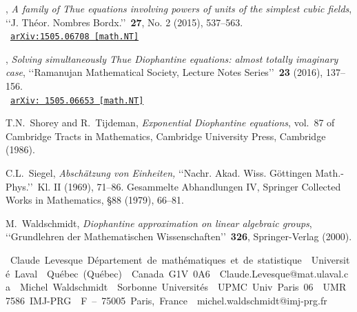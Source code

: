 \documentclass[leqno,11pt]{article}
\begin{document}
\begin{thebibliography}{99}
{\bysame}, {\em
A family of Thue equations involving powers of units of the simplest cubic fields}, 
\lq\lq J. Th\'eor. Nombres Bordx.\rq\rq\ {\bf 27}, No. 2 (2015), 537--563.
 \\
\hbox{ 
\small \tt \href{http://arxiv.org/abs/1505.06708}{\tt arXiv:1505.06708 [math.NT]}}


 

{\bysame}, 
{\em
Solving simultaneously Thue Diophantine equations: almost totally imaginary case},
\lq\lq Ramanujan Mathematical Society, Lecture Notes Series\rq\rq\
{\bf 23} %
(2016), 137--156.
\\
\hbox{ 
\small \tt \href{http://arxiv.org/abs/1505.06653}{\tt arXiv: 1505.06653 [math.NT]}}




{\sc T.N.~Shorey and R.~Tijdeman}, {\em Exponential {D}iophantine equations},
 vol.~87 of Cambridge Tracts in Mathematics, Cambridge University Press,
 Cambridge (1986).

{\sc C.L.~Siegel}, {\em
Absch\"atzung von Einheiten,} \lq\lq Nachr. Akad. Wiss. G\"ottingen Math.-Phys.\rq\rq\ Kl. II (1969), 71--86. 
Gesammelte Abhandlungen IV, Springer Collected Works in Mathematics, \S88 (1979), 66--81.

{\sc M.~Waldschmidt}, {\em Diophantine approximation on linear algebraic groups},
 \lq\lq Grundlehren der Mathematischen Wissenschaften\rq\rq\ {\bf 326},
 Springer-Verlag (2000).

\end{thebibliography}

\vfill
 \vfill
 
\hbox{
\small
\vbox{
\hbox{Claude \sc Levesque}
	\hbox{D\'{e}partement de math\'{e}matiques et de statistique
	}
	\hbox{Universit\'{e} Laval
	}
	\hbox{Qu\'{e}bec (Qu\'{e}bec)
	}
	\hbox{\sc Canada G1V 0A6
	}
	\hbox{Claude.Levesque@mat.ulaval.ca
	}
}	
\hfill
\vbox{	\hbox{Michel \sc Waldschmidt
	}
	\hbox{Sorbonne Universit\'es
	}
	\hbox{UPMC Univ Paris 06
	}
	\hbox{UMR 7586 IMJ-PRG
	}
	\hbox{F -- 75005 Paris, \sc France 
	}
	\hbox{michel.waldschmidt@imj-prg.fr}
}	
}	
\end{document}

